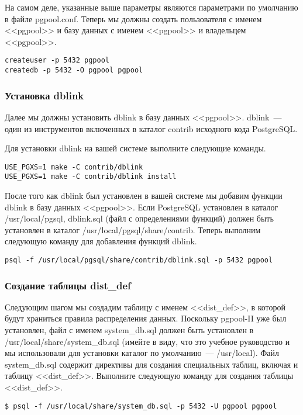 На самом деле, указанные выше параметры являются параметрами по умолчанию в файле pgpool.conf. Теперь мы должны
создать пользователя с именем <<pgpool>> и базу данных с именем <<pgpool>> и владельцем <<pgpool>>.
\begin{lstlisting}[label=lst:pgpool27,caption=Настройка SystemDB]
createuser -p 5432 pgpool
createdb -p 5432 -O pgpool pgpool
\end{lstlisting}

\subsubsection{Установка dblink}
Далее мы должны установить dblink в базу данных <<pgpool>>. dblink~--- один из инструментов включенных в каталог
contrib исходного кода PostgreSQL.

Для установки dblink на вашей системе выполните следующие команды.
\begin{lstlisting}[label=lst:pgpool28,caption=Установка dblink]
USE_PGXS=1 make -C contrib/dblink
USE_PGXS=1 make -C contrib/dblink install
\end{lstlisting}

После того как dblink был установлен в вашей системе мы добавим функции dblink в базу данных <<pgpool>>. Если PostgreSQL
установлен в каталог /usr/local/pgsql, dblink.sql (файл с определениями функций) должен быть установлен в каталог
/usr/local/pgsql/share/contrib. Теперь выполним следующую команду для добавления функций dblink.
\begin{lstlisting}[label=lst:pgpool29,caption=Установка dblink]
psql -f /usr/local/pgsql/share/contrib/dblink.sql -p 5432 pgpool
\end{lstlisting}

\subsubsection{Создание таблицы dist\_def}
Следующим шагом мы создадим таблицу с именем <<dist\_def>>, в которой будут храниться правила распределения данных.
Поскольку pgpool-II уже был установлен, файл с именем system\_db.sql должен быть установлен в
/usr/local/share/system\_db.sql (имейте в виду, что это учебное руководство и мы использовали для установки каталог
по умолчанию~--- /usr/local). Файл system\_db.sql содержит директивы для создания специальных таблиц, включая и
таблицу <<dist\_def>>. Выполните следующую команду для создания таблицы <<dist\_def>>.
\begin{lstlisting}[label=lst:pgpool30,caption=Создание таблицы dist\_def]
$ psql -f /usr/local/share/system_db.sql -p 5432 -U pgpool pgpool
\end{lstlisting}

